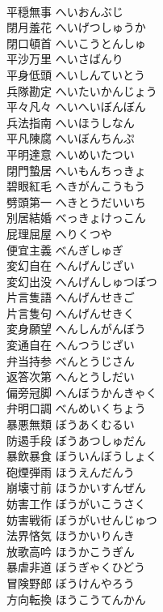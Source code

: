 \documentclass[8pt]{extreport}
\begin{document}
\begin{CJK}{UTF8}{min}
\\	平穏無事	へいおんぶじ	
\\	閉月羞花	へいげつしゅうか	
\\	閉口頓首	へいこうとんしゅ	
\\	平沙万里	へいさばんり	
\\	平身低頭	へいしんていとう	
\\	兵隊勘定	へいたいかんじょう	
\\	平々凡々	へいへいぼんぼん	
\\	兵法指南	へいほうしなん	
\\	平凡陳腐	へいぼんちんぷ	
\\	平明達意	へいめいたつい	
\\	閉門蟄居	へいもんちっきょ	
\\	碧眼紅毛	へきがんこうもう	
\\	劈頭第一	へきとうだいいち	
\\	別居結婚	べっきょけっこん	
\\	屁理屈屋	へりくつや	
\\	便宜主義	べんぎしゅぎ	
\\	変幻自在	へんげんじざい	
\\	変幻出没	へんげんしゅつぼつ	
\\	片言隻語	へんげんせきご	
\\	片言隻句	へんげんせきく	
\\	変身願望	へんしんがんぼう	
\\	変通自在	へんつうじざい	
\\	弁当持参	べんとうじさん	
\\	返答次第	へんとうしだい	
\\	偏旁冠脚	へんぼうかんきゃく	
\\	弁明口調	べんめいくちょう	
\\	暴悪無類	ぼうあくむるい	
\\	防遏手段	ぼうあつしゅだん	
\\	暴飲暴食	ぼういんぼうしょく	
\\	砲煙弾雨	ほうえんだんう	
\\	崩壊寸前	ほうかいすんぜん	
\\	妨害工作	ぼうがいこうさく	
\\	妨害戦術	ぼうがいせんじゅつ	
\\	法界悋気	ほうかいりんき	
\\	放歌高吟	ほうかこうぎん	
\\	暴虐非道	ぼうぎゃくひどう	
\\	冒険野郎	ぼうけんやろう	
\\	方向転換	ほうこうてんかん	

\end{CJK}
\end{document}
